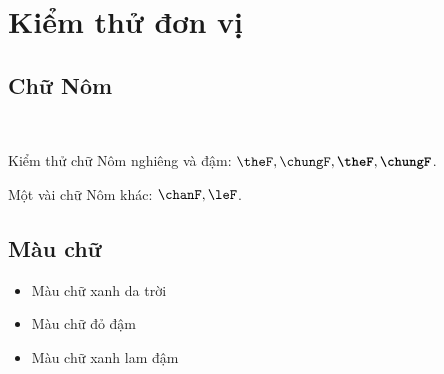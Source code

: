 \chapter*{Kiểm thử đơn vị}

\section{Chữ Nôm}

\ %

Kiểm thử chữ Nôm nghiêng và đậm: $\theF, \chungF, \textbf{\theF}, \textbf{\chungF}$.

Một vài chữ Nôm khác: $\chanF, \leF$.

\section{Màu chữ}

\begin{itemize}
   \item \textcolor{colorEmphasisCyan}{Màu chữ xanh da trời}
   \item \textcolor{colorEmphasis}{Màu chữ đỏ đậm}
   \item \textcolor{colorEmphasisGreen}{Màu chữ xanh lam đậm}
\end{itemize}


